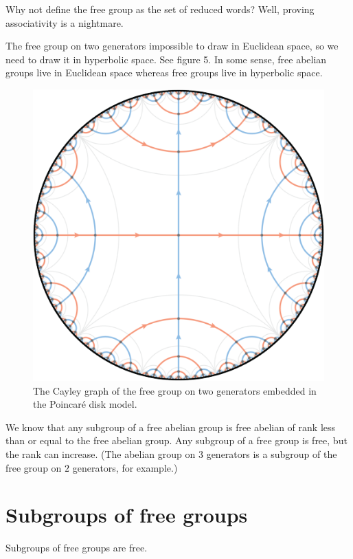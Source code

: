 \documentclass[11pt, oneside]{amsart}
\begin{document}
Why not define the free group as the set of reduced words? Well,  proving associativity is a nightmare. 

The free group on two generators impossible to draw in Euclidean space, so we need to draw it in hyperbolic space. See figure 5. In some sense, free abelian groups live in Euclidean space whereas free groups live in hyperbolic space.
\begin{figure}
\centering
\includegraphics[scale=0.3]{images/free_group_on_two_generators}
\caption{The Cayley graph of the free group on two generators embedded in the Poincar\'e disk model.}
\end{figure}

We know that any subgroup of a free abelian group is free abelian of rank less than or equal to the free abelian group. Any subgroup of a free group is free, but the rank can increase. (The abelian group on $3$ generators is a subgroup of the free group on $2$ generators, for example.)

\section{Subgroups of free groups}
\begin{proposition}
Subgroups of free groups are free.
\end{proposition}
\end{document}
